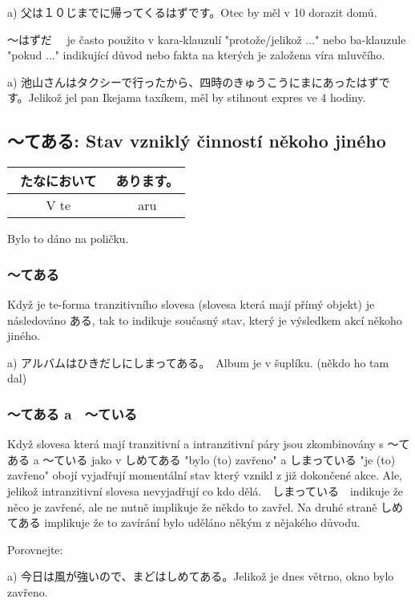 a) 父は１０じまでに帰ってくるはずです。Otec by měl v 10 dorazit domů.

〜はずだ　 je často použito v kara-klauzulí "protože/jelikož ..." nebo ba-klauzule "pokud ..." indikující důvod nebo fakta na kterých je založena víra mluvčího.

a) 池山さんはタクシーで行ったから、四時のきゅうこうにまにあったはずです。Jelikož jel pan Ikejama taxíkem, měl by stihnout expres ve 4 hodiny.

\subsection{〜てある: Stav vzniklý činností někoho jiného}
\begin{center}
\begin{tabular}{||c|c||}
\hline
たなにおいて　&あります。\\
\hline
V te & aru\\
\hline
\end{tabular}
\end{center}
Bylo to dáno na poličku.

\subsubsection{〜てある}
Když je te-forma tranzitivního slovesa (slovesa která mají přímý objekt) je následováno ある, tak to indikuje současný stav, který je výsledkem akcí někoho jiného.

a) アルバムはひきだしにしまってある。　Album je v šuplíku. (někdo ho tam dal)

\subsubsection{〜てある a　〜ている}



Když slovesa která mají tranzitivní a intranzitivní páry jsou zkombinovány s 〜てある a 〜ている jako v しめてある "bylo (to) zavřeno" a しまっている "je (to) zavřeno" obojí vyjadřují momentální stav který vznikl z již dokončené akce. Ale, jelikož intranzitivní slovesa nevyjadřují co kdo dělá.　しまっている　indikuje že něco je zavřené, ale ne nutně implikuje že někdo to zavřel. Na druhé straně しめてある implikuje že to zavírání bylo uděláno někým z nějakého důvodu.

Porovnejte:

a) 今日は風が強いので、まどはしめてある。Jelikož je dnes větrno, okno bylo zavřeno.

